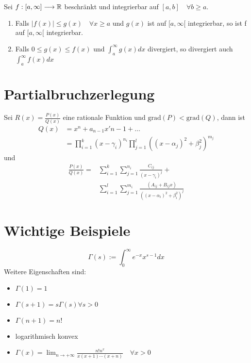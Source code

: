 \Lemma Sei $f:[a,\infty] \longrightarrow \mathbb{R}$ beschränkt und integrierbar auf $[a,b] \quad \forall b \geq a$.
\begin{enumerate}
  \item Falls $|f(x)| \leqslant g(x) \quad \forall x \geqslant a$ und $g(x)$ ist auf $[a, \infty[$ integrierbar, so ist f auf $[a, \infty[$ integrierbar.
  \item Falls $0 \leqslant g(x) \leqslant f(x)$ und $\int_a^\infty g(x) dx$ divergiert, so divergiert auch $\int_a^\infty f(x) dx$
\end{enumerate}

\section{Partialbruchzerlegung}
\Trick Sei $R(x) = \frac{P(x)}{Q(x)}$ eine rationale Funktion und $\text{grad}(P) < \text{grad}(Q)$, dann ist
\begin{align*}
Q(x) &= x^n + a_{n-1}x'{n-1}+\dots \\
	 &=	\prod_{i=1}^{k}\left(x-\gamma_{i}\right)^{n_{i}} \prod_{j=1}^{l}\left(\left(x-\alpha_{j}\right)^{2}+\beta_{j}^{2}\right)^{m_{j}} 
\end{align*}
und
\begin{align*}
\frac{P(x)}{Q(x)}=&\sum_{i=1}^{k} \sum_{j=1}^{n_{i}} \frac{C_{i j}}{\left(x-\gamma_{i}\right)^{j}}+ \\
				 &\sum_{i=1}^{l} \sum_{j=1}^{m_{i}} \frac{\left(A_{i j}+B_{i j} x\right)}{\left(\left(x-\alpha_{i}\right)^{2}+\beta_{i}^{2}\right)^{j}}
\end{align*}

\section{Wichtige Beispiele}
$$
\Gamma(s):=\int_{0}^{\infty} e^{-x} x^{s-1} d x
$$
Weitere Eigenschaften sind:
\begin{itemize}
	\item $\Gamma(1) = 1$
	\item $\Gamma(s+1) = s \Gamma(s) \forall s>0$
	\item $\Gamma(n+1) = n!$
	\item logarithmisch konvex
	\item $\Gamma(x)=\lim _{n \rightarrow+\infty} \frac{n ! n^{x}}{x(x+1) \cdots(x+n)} \quad \forall x>0$
\end{itemize}
